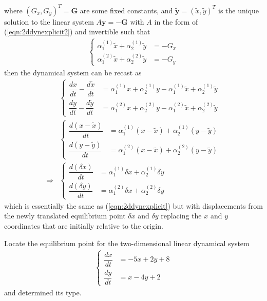 where $(G_x, G_y)^T = \textbf{G}$ are some fixed constants, and $\tilde{\textbf{y}} = (\tilde{x}, \tilde{y})^T$ is the unique solution to the linear system $A\textbf{y} = -\textbf{G}$ with $A$ in the form of (\ref{eqn:2ddynexplicit2}) and invertible such that
\begin{align}
\left\{\begin{alignedat}{1}
\alpha_1^{(1)} \tilde{x} + \alpha_2^{(1)} \tilde{y} &= -G_x \\
\alpha_1^{(2)} \tilde{x} + \alpha_2^{(2)} \tilde{y} &= -G_y 
\end{alignedat}\right.
\end{align}
then the dynamical system can be recast as
\begin{align}
&\left\{\begin{alignedat}{1}
\dfrac{dx}{dt} - \dfrac{d\tilde{x}}{dt} &= \alpha_1^{(1)} x + \alpha_2^{(1)} y - \alpha_1^{(1)} \tilde{x} + \alpha_2^{(1)} \tilde{y} \\
\dfrac{dy}{dt} - \dfrac{d\tilde{y}}{dt} &= \alpha_1^{(2)} x + \alpha_2^{(2)} y - \alpha_1^{(2)} \tilde{x} + \alpha_2^{(2)} \tilde{y} 
\end{alignedat}\right. \nonumber \\
&\left\{\begin{alignedat}{1}
\dfrac{d(x-\tilde{x})}{dt} &= \alpha_1^{(1)} (x-\tilde{x}) + \alpha_2^{(1)} (y-\tilde{y}) \\
\dfrac{d(y-\tilde{y})}{dt} &= \alpha_1^{(2)} (x-\tilde{x}) + \alpha_2^{(2)} (y-\tilde{y})
\end{alignedat}\right. \nonumber \\
\Rightarrow &\left\{\begin{alignedat}{1}
\dfrac{d(\delta x)}{dt} &= \alpha_1^{(1)} \delta x + \alpha_2^{(1)} \delta y \\
\dfrac{d(\delta y)}{dt} &= \alpha_1^{(2)} \delta x + \alpha_2^{(2)} \delta y
\end{alignedat}\right.
\label{eqn:2ddynfull}
\end{align}
which is essentially the same as (\ref{eqn:2ddynexplicit}) but with displacements from the newly translated equilibrium point $\delta x$ and $\delta y$ replacing the $x$ and $y$ coordinates that are initially relative to the origin.
\begin{exmp}
Locate the equilibrium point for the two-dimensional linear dynamical system
\begin{align*}
\left\{\begin{alignedat}{1}
\dfrac{dx}{dt} &= -5x + 2y + 8 \\
\dfrac{dy}{dt} &= x - 4y + 2
\end{alignedat}\right.
\end{align*}
and determined its type.
\end{exmp}
